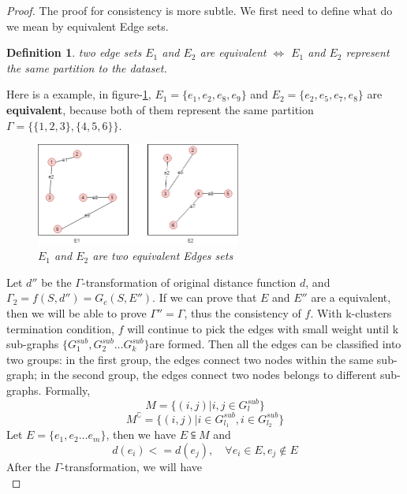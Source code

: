 \documentclass{uonmathreport}
\newtheorem{definition}{Definition}[section]
\begin{document}
\begin{proof}
The proof for consistency is more subtle. We first need to define what do we mean by equivalent Edge sets.
\begin{definition}
two edge sets $E_1$ and $E_2$ are equivalent $\iff$ $E_1$ and $E_2$ represent the same partition to the dataset. 
\end{definition}
Here is a example, in figure-\ref{fig:proof2}, $E_1=\{e_1,e_2,e_8,e_9\}$ and $E_2=\{e_2,e_5,e_7,e_8\}$ are \textbf{equivalent}, because both of them represent the same partition $\Gamma = \{\{1,2,3\},\{4,5,6\}\}$. 
\begin{figure}[H]
 \begin{center}
   \includegraphics[width=0.6\textwidth]{proof.png}
 \end{center}
 \caption{\textit{$E_1$ and $E_2$ are two equivalent Edges sets}}
 \label{fig:proof2}
\end{figure}
Let $d''$ be the $\Gamma$-transformation of original distance function $d$, and $\Gamma_2 =f(S,d'') =G_c(S,E'')$. If we can prove that $E$ and $E''$ are a equivalent, then we will be able to prove $\Gamma'' = \Gamma$, thus the consistency of $f$.  With k-clusters termination condition, $f$ will continue to pick the edges with small weight until k sub-graphs $\{G_1^{sub},G_2^{sub}\ldots G_k^{sub}\}$are formed. Then all the edges can be classified into two groups: in the first group, the edges connect two nodes within the same sub-graph; in the second group, the edges connect two nodes belongs to different sub-graphs. Formally,
\begin{equation}
M = \{(i,j)|i,j\in G_l^{sub}\}
\end{equation}
\begin{equation}
M^\complement = \{(i,j)|i\in G_{l_1}^{sub},i\in G_{l_2}^{sub}\}
\end{equation}
Let $E=\{e_1,e_2\ldots e_m\}$, then we have $E\subseteqq M$ and 
\begin{equation}
\label{eq:cons1}
d(e_i)<=d(e_j), \quad \forall e_i\in E, e_j\notin E
\end{equation}
After the $\Gamma$-transformation, we will have 
\begin{equation}

\end{equation}
\end{proof}
\end{document}
